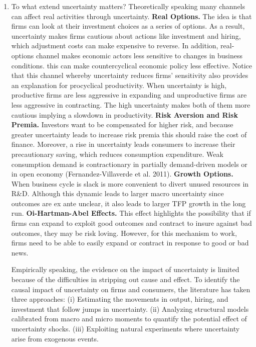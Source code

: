 \documentclass{article}
\begin{document}
{\begin{enumerate}
	Uncertainty tends to be higher in developing countries because they are (i) less-diversified economies, (ii) appear to have more domestic political shocks (revolutions, \dots) or natural disasters (epidemics, \dots), and (iii) have less effective stabilization policies.
	
	\item To what extend uncertainty matters? Theoretically speaking many channels can affect real activities through uncertainty. \textbf{Real Options.} The idea is that firms can look at their investment choices as a series of options. As a result, uncertainty makes firms cautious about actions like investment and hiring, which adjustment costs can make expensive to reverse. In addition, real-options channel makes economic actors less sensitive to changes in business conditions. this can make countercyclical economic policy less effective. Notice that this channel whereby uncertainty reduces firms' sensitivity also provides an explanation for procyclical productivity. When uncertainty is high, productive firms are less aggressive in expanding and unproductive firms are less aggressive in contracting. The high uncertainty makes both of them more cautious implying a slowdown in productivity. \textbf{Risk Aversion and Risk Premia.} Investors want to be compensated for higher risk, and because greater uncertainty leads to increase risk premia this should raise the cost of finance. Moreover, a rise in uncertainty leads consumers to increase their precautionary saving, which reduces consumption expenditure. Weak consumption demand is contractionary in partially demand-driven models or in open economy (Fernandez-Villaverde et al. 2011). \textbf{Growth Options.} When business cycle is slack is more convenient to divert unused resources in R\&D. Although this dynamic leads to larger macro uncertainty since outcomes are ex ante unclear, it also leads to larger TFP growth in the long run. \textbf{Oi-Hartman-Abel Effects.} This effect highlights the possibility that if firms can expand to exploit good outcomes and contract to insure against bad outcomes, they may be risk loving. However, for this mechanism to work, firms need to be able to easily expand or contract in response to good or bad news. 
	
	Empirically speaking, the evidence on the impact of uncertainty is limited because of the difficulties in stripping out cause and effect. To identify the causal impact of uncertainty on firms and consumers, the literature has taken three approaches: (i) Estimating the movements in output, hiring, and investment that follow jumps in uncertainty. (ii) Analyzing structural models calibrated from macro and micro moments to quantify the potential effect of uncertainty shocks. (iii) Exploiting natural experiments where uncertainty arise from exogenous events. 
	

\end{enumerate}}
\end{document}

